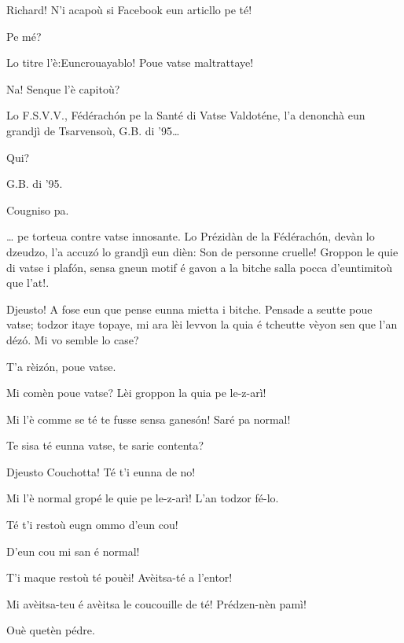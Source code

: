 \begin{drama}
\scene[-- G.B. di '95]

\Saventaspeaks Richard! N'i acapoù si Facebook eun articllo pe té!

\Richardspeaks Pe mé?

\Saventaspeaks Lo titre l'è:\og Euncrouayablo! Poue vatse maltrattaye\fg!

\Gerominespeaks Na! Senque l'è capitoù?

\Saventaspeaks Lo F.S.V.V., Fédérach\'on pe la Santé di Vatse Valdoténe, l'a denonchà eun grandjì de Tsarvensoù, G.B. di '95\ldots

\Tuenospeaks Qui?

\Saventaspeaks G.B. di '95.

\Tuenospeaks Cougniso pa.

\Saventaspeaks{} \ldots
pe \og torteua contre vatse innosante\fg. 
Lo Prézidàn de la Fédérach\'on, devàn lo dzeudzo, l'a accuz\'o lo grandjì  eun dièn: \og Son de personne cruelle! Groppon le quie di vatse i plaf\'on, sensa gneun motif é gavon a la bitche salla pocca d'euntimitoù que l'at!\fg.

\Richardspeaks Djeusto! A fose eun que pense eunna mietta i bitche. Pensade a seutte poue vatse; todzor itaye topaye, mi ara lèi levvon la quia é tcheutte vèyon sen que l'an déz\'o. Mi vo semble lo case?

\Gerominespeaks T'a rèiz\'on, poue vatse.

\Tuenospeaks Mi comèn poue vatse? Lèi groppon la quia pe le-z-arì! 

\Richardspeaks Mi l'è comme se té te fusse sensa ganes\'on! Saré pa normal!

\Gerominespeaks{} Te sisa té eunna vatse, te sarie contenta?

\Richardspeaks Djeusto Couchotta! Té t'i eunna de no!

\Tuenospeaks Mi l'è normal gropé le quie pe le-z-arì! L'an todzor fé-lo.

\Richardspeaks Té t'i restoù eugn ommo d'eun cou!

\Tuenospeaks D'eun cou mi san é normal!

\Richardspeaks T'i maque restoù té pouèi! Avèitsa-té a l'entor!

\Tuenospeaks Mi avèitsa-teu é avèitsa le coucouille de té! Prédzen-nèn pamì!

\Richardspeaks Ouè quetèn pédre.




\end{drama}
